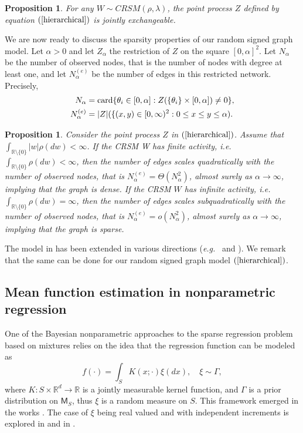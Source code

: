 \documentclass{article}
\theoremstyle{plain}
\newtheorem{proposition}[theorem]{Proposition}
\theoremstyle{remark}
\begin{document}
\begin{proposition}\label{pro-exchange}
	For any $W\sim CRSM(\rho,\lambda)$, the point process $Z$ defined by equation $(\ref{hierarchical})$ is jointly exchangeable.
\end{proposition} 

We are now ready to discuss the sparsity properties of our random signed graph model. Let $\alpha>0$ and let $Z_\alpha$ the restriction of $Z$ on the square $[0,\alpha]^2$. Let $N_\alpha$ be the number of observed nodes, that is the number of nodes with degree at least one, and let $N_\alpha^{(e)}$ be the number of edges in this restricted network.  Precisely,
\begin{align*}
	N_\alpha&=\textnormal{card}\{\theta_i\in[0,\alpha]:Z(\{\theta_i\}\times[0,\alpha])\neq 0\},\\
	N_\alpha^{(e)}&=|Z|(\{(x,y)\in[0,\infty)^2: 0\leq x\leq y\leq\alpha).
\end{align*}


\begin{proposition}\label{pro-sparse}
	Consider the point process $Z$ in $(\ref{hierarchical})$. Assume that $\int_{\mathbb{R}\setminus\{0\}}|w|\rho(dw)<\infty$. If the CRSM W has finite activity, \textit{i.e.}~$\int_{\mathbb{R}\setminus\{0\}}\rho(dw)<\infty$, then the number of edges scales quadratically with the number of observed nodes, that is $N_{\alpha}^{(e)}=\Theta(N_{\alpha}^2)$, almost surely as $\alpha\to\infty$, implying that the graph is dense. If the CRSM $W$ has infinite activity, \textit{i.e.}~$\int_{\mathbb{R}\setminus\{0\}}\rho(dw)=\infty$, then the number of edges scales subquadratically with the number of observed nodes, that is $N_{\alpha}^{(e)}=o(N_{\alpha}^2)$, almost surely as $\alpha\to\infty$, implying that the graph is sparse.
\end{proposition}

The model in \citet{Caron-and-Fox} has been extended in various directions (\textit{e.g.}~\citet{CaronMiscouridou} and \citet{RicciGuindaniS22}). We remark that the same can be done for our random signed graph model $(\ref{hierarchical})$.

\subsection{Mean function estimation in nonparametric regression}\label{Sec-Mean}
One of the Bayesian nonparametric approaches to the sparse regression problem based on mixtures relies on the idea that the regression function can be modeled as
\begin{equation*}
	f(\cdot)=\int_SK(x;\cdot)\xi(dx),\quad \xi\sim\Gamma,
\end{equation*}
where $K:S\times\mathbb{R}^d\to\mathbb{R}$ is a jointly measurable kernel function, and $\Gamma$ is a prior distribution on $\mathsf{M}_{S}$, thus $\xi$ is a random measure on $S$. This framework emerged in the works \citet{DeBlasiPeccatiPrunster,GhosalVanDerVaart2007,IshwaranJames,LijoiNipoti,LoWeng1989,PeccatiPrunster09}. The case of $\xi$ being real valued and with independent increments is explored in \citet{Naulet} and in \citet{Wolpert}. 
\end{document}
